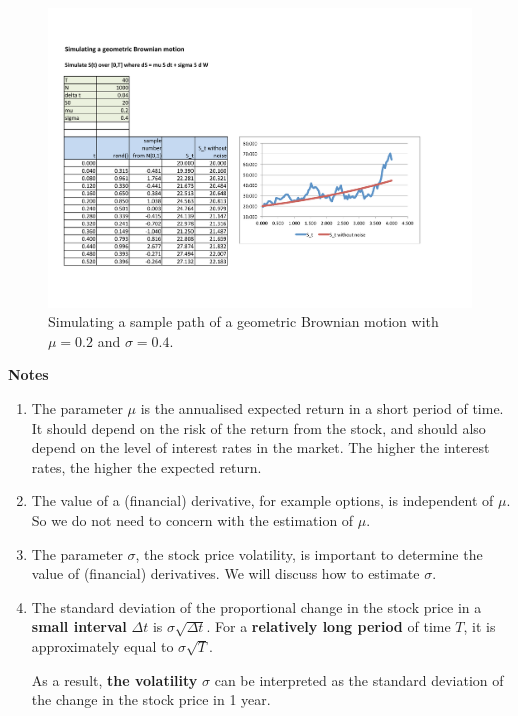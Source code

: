 \documentclass[
]{book}
\theoremstyle{definition}
\theoremstyle{definition}
\theoremstyle{definition}
\theoremstyle{definition}
\theoremstyle{remark}
\begin{document}
\begin{figure}
\hypertarget{fig:GBM}{%
\centering
\includegraphics[width=8in,height=\textheight]{GBM.pdf}
\caption{Simulating a sample path of a geometric Brownian motion with
\(\mu =0.2\) and \(\sigma = 0.4\).}\label{fig:GBM}
}
\end{figure}

\textbf{Notes}

\begin{enumerate}
\def\labelenumi{\arabic{enumi}.}
\item
  The parameter \(\mu\) is the annualised expected return in a short
  period of time. It should depend on the risk of the return from the
  stock, and should also depend on the level of interest rates in the
  market. The higher the interest rates, the higher the expected
  return.
\item
  The value of a (financial) derivative, for example options, is
  independent of \(\mu\). So we do not need to concern with the
  estimation of \(\mu\).
\item
  The parameter \(\sigma\), the stock price volatility, is important to
  determine the value of (financial) derivatives. We will discuss how
  to estimate \(\sigma\).
\item
  The standard deviation of the proportional change in the stock price
  in a \textbf{small interval} \(\Delta t\) is \(\sigma \sqrt{\Delta t}\). For
  a \textbf{relatively long period} of time \(T\), it is approximately equal
  to \(\sigma \sqrt{T}\).

  As a result, \textbf{the volatility} \(\sigma\) can be interpreted as the
  standard deviation of the change in the stock price in 1 year.
\end{enumerate}
\end{document}
